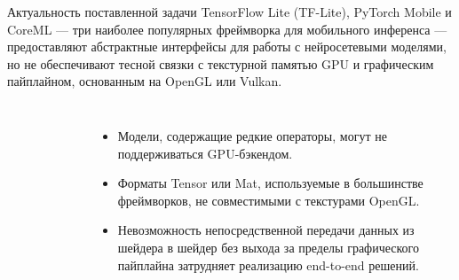 \documentclass[aspectratio=169,xcolor=dvipsnames]{beamer}
\begin{document}
\begin{frame}{Актуальность поставленной задачи}
    TensorFlow Lite (TF-Lite), PyTorch Mobile и CoreML — три наиболее популярных фреймворка для мобильного инференса — предоставляют абстрактные интерфейсы для работы с нейросетевыми моделями, но не обеспечивают тесной связки с текстурной памятью GPU и графическим пайплайном, основанным на OpenGL или Vulkan.
    \begin{columns}[c] %

        \begin{figure}[h]
            \label{ris:ORTModelData}
        \end{figure}
        
        \begin{itemize}
            \item Модели, содержащие редкие операторы, могут не поддерживаться GPU-бэкендом.
            \item Форматы Tensor или Mat, используемые в большинстве фреймворков, не совместимыми с текстурами OpenGL.
            \item Невозможность непосредственной передачи данных из шейдера в шейдер без выхода за пределы графического пайплайна затрудняет реализацию end-to-end решений.
        \end{itemize}

    \end{columns}
\end{frame}

\end{document}
